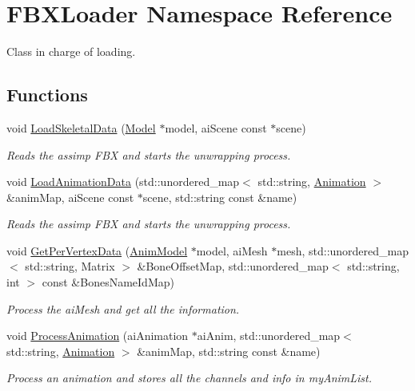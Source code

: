 \hypertarget{namespaceFBXLoader}{}\section{F\+B\+X\+Loader Namespace Reference}
\label{namespaceFBXLoader}


Class in charge of loading.  


\subsection*{Functions}
\begin{DoxyCompactItemize}
\item 
void \hyperlink{namespaceFBXLoader_ab8afca89259e2c7c946cb25151f0b248}{Load\+Skeletal\+Data} (\hyperlink{classModel}{Model} $\ast$model, ai\+Scene const $\ast$scene)
\begin{DoxyCompactList}\small\item\em Reads the assimp F\+BX and starts the unwrapping process. \end{DoxyCompactList}\item 
void \hyperlink{namespaceFBXLoader_a091c2cfe5695ef3ed1c608ae715c4e5a}{Load\+Animation\+Data} (std\+::unordered\+\_\+map$<$ std\+::string, \hyperlink{structAnimation}{Animation} $>$ \&anim\+Map, ai\+Scene const $\ast$scene, std\+::string const  \&name)
\begin{DoxyCompactList}\small\item\em Reads the assimp F\+BX and starts the unwrapping process. \end{DoxyCompactList}\item 
void \hyperlink{namespaceFBXLoader_a339ce5cb5980d1e7003fbd8b203ab071}{Get\+Per\+Vertex\+Data} (\hyperlink{classAnimModel}{Anim\+Model} $\ast$model, ai\+Mesh $\ast$mesh, std\+::unordered\+\_\+map$<$ std\+::string, Matrix $>$ \&Bone\+Offset\+Map, std\+::unordered\+\_\+map$<$ std\+::string, int $>$ const  \&Bones\+Name\+Id\+Map)
\begin{DoxyCompactList}\small\item\em Process the ai\+Mesh and get all the information. \end{DoxyCompactList}\item 
void \hyperlink{namespaceFBXLoader_a5d956918f0d65bb07a68044fa1c10077}{Process\+Animation} (ai\+Animation $\ast$ai\+Anim, std\+::unordered\+\_\+map$<$ std\+::string, \hyperlink{structAnimation}{Animation} $>$ \&anim\+Map, std\+::string const  \&name)
\begin{DoxyCompactList}\small\item\em Process an animation and stores all the channels and info in my\+Anim\+List. \end{DoxyCompactList}\item 

\end{DoxyCompactItemize}
